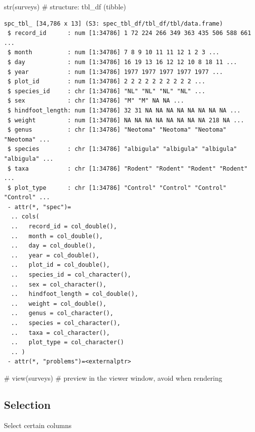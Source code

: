 \documentclass[
  letterpaper,
  DIV=11,
  numbers=noendperiod]{scrreprt}
\newenvironment{Shaded}{\begin{snugshade}}{\end{snugshade}}
\newcommand{\CommentTok}[1]{\textcolor[rgb]{0.37,0.37,0.37}{#1}}
\newcommand{\FunctionTok}[1]{\textcolor[rgb]{0.28,0.35,0.67}{#1}}
\newcommand{\NormalTok}[1]{\textcolor[rgb]{0.00,0.23,0.31}{#1}}
\begin{document}
\begin{Shaded}
\begin{Highlighting}[]
\FunctionTok{str}\NormalTok{(surveys)    }\CommentTok{\# structure: tbl\_df (tibble)}
\end{Highlighting}
\end{Shaded}

\begin{verbatim}
spc_tbl_ [34,786 x 13] (S3: spec_tbl_df/tbl_df/tbl/data.frame)
 $ record_id      : num [1:34786] 1 72 224 266 349 363 435 506 588 661 ...
 $ month          : num [1:34786] 7 8 9 10 11 11 12 1 2 3 ...
 $ day            : num [1:34786] 16 19 13 16 12 12 10 8 18 11 ...
 $ year           : num [1:34786] 1977 1977 1977 1977 1977 ...
 $ plot_id        : num [1:34786] 2 2 2 2 2 2 2 2 2 2 ...
 $ species_id     : chr [1:34786] "NL" "NL" "NL" "NL" ...
 $ sex            : chr [1:34786] "M" "M" NA NA ...
 $ hindfoot_length: num [1:34786] 32 31 NA NA NA NA NA NA NA NA ...
 $ weight         : num [1:34786] NA NA NA NA NA NA NA NA 218 NA ...
 $ genus          : chr [1:34786] "Neotoma" "Neotoma" "Neotoma" "Neotoma" ...
 $ species        : chr [1:34786] "albigula" "albigula" "albigula" "albigula" ...
 $ taxa           : chr [1:34786] "Rodent" "Rodent" "Rodent" "Rodent" ...
 $ plot_type      : chr [1:34786] "Control" "Control" "Control" "Control" ...
 - attr(*, "spec")=
  .. cols(
  ..   record_id = col_double(),
  ..   month = col_double(),
  ..   day = col_double(),
  ..   year = col_double(),
  ..   plot_id = col_double(),
  ..   species_id = col_character(),
  ..   sex = col_character(),
  ..   hindfoot_length = col_double(),
  ..   weight = col_double(),
  ..   genus = col_character(),
  ..   species = col_character(),
  ..   taxa = col_character(),
  ..   plot_type = col_character()
  .. )
 - attr(*, "problems")=<externalptr> 
\end{verbatim}

\begin{Shaded}
\begin{Highlighting}[]
\CommentTok{\# view(surveys) \# preview in the viewer window, avoid when rendering}
\end{Highlighting}
\end{Shaded}

\subsection{Selection}\label{selection}

Select certain columns
\end{document}
